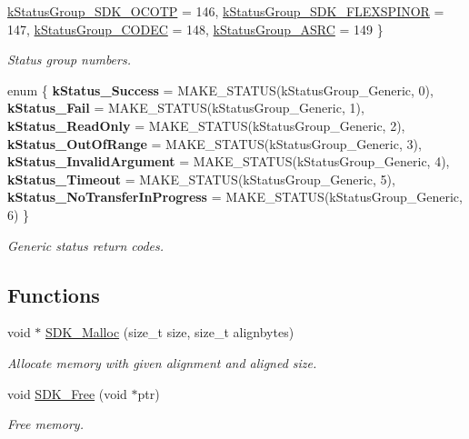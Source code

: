 \begin{DoxyCompactItemize}
\mbox{\hyperlink{group__ksdk__common_gga7ff0b98bb1341c07acefb1473b6eda29a539b147c0d1409a0e11c3ae340886fa8}{k\+Status\+Group\+\_\+\+S\+D\+K\+\_\+\+O\+C\+O\+TP}} = 146, 
\mbox{\hyperlink{group__ksdk__common_gga7ff0b98bb1341c07acefb1473b6eda29a830e5b42a05424dc026bd36d30f143a5}{k\+Status\+Group\+\_\+\+S\+D\+K\+\_\+\+F\+L\+E\+X\+S\+P\+I\+N\+OR}} = 147, 
\mbox{\hyperlink{group__ksdk__common_gga7ff0b98bb1341c07acefb1473b6eda29a7c488d28bc9be2e29bd0d133bce7389a}{k\+Status\+Group\+\_\+\+C\+O\+D\+EC}} = 148, 
\mbox{\hyperlink{group__ksdk__common_gga7ff0b98bb1341c07acefb1473b6eda29a713723bd8764655328f1e5283a8e6020}{k\+Status\+Group\+\_\+\+A\+S\+RC}} = 149
 \}
\begin{DoxyCompactList}\small\item\em Status group numbers. \end{DoxyCompactList}\item 
\mbox{\label{group__ksdk__common_gab48899087cc647f0f791ed0c459adc53}} 
enum \{ \newline
{\bfseries k\+Status\+\_\+\+Success} = M\+A\+K\+E\+\_\+\+S\+T\+A\+T\+US(k\+Status\+Group\+\_\+\+Generic, 0), 
{\bfseries k\+Status\+\_\+\+Fail} = M\+A\+K\+E\+\_\+\+S\+T\+A\+T\+US(k\+Status\+Group\+\_\+\+Generic, 1), 
{\bfseries k\+Status\+\_\+\+Read\+Only} = M\+A\+K\+E\+\_\+\+S\+T\+A\+T\+US(k\+Status\+Group\+\_\+\+Generic, 2), 
{\bfseries k\+Status\+\_\+\+Out\+Of\+Range} = M\+A\+K\+E\+\_\+\+S\+T\+A\+T\+US(k\+Status\+Group\+\_\+\+Generic, 3), 
\newline
{\bfseries k\+Status\+\_\+\+Invalid\+Argument} = M\+A\+K\+E\+\_\+\+S\+T\+A\+T\+US(k\+Status\+Group\+\_\+\+Generic, 4), 
{\bfseries k\+Status\+\_\+\+Timeout} = M\+A\+K\+E\+\_\+\+S\+T\+A\+T\+US(k\+Status\+Group\+\_\+\+Generic, 5), 
{\bfseries k\+Status\+\_\+\+No\+Transfer\+In\+Progress} = M\+A\+K\+E\+\_\+\+S\+T\+A\+T\+US(k\+Status\+Group\+\_\+\+Generic, 6)
 \}
\begin{DoxyCompactList}\small\item\em Generic status return codes. \end{DoxyCompactList}\end{DoxyCompactItemize}
\subsection*{Functions}
\begin{DoxyCompactItemize}
\item 
void $\ast$ \mbox{\hyperlink{group__ksdk__common_ga4e1420d9e817ebe0e8973420411de015}{S\+D\+K\+\_\+\+Malloc}} (size\+\_\+t size, size\+\_\+t alignbytes)
\begin{DoxyCompactList}\small\item\em Allocate memory with given alignment and aligned size. \end{DoxyCompactList}\item 
void \mbox{\hyperlink{group__ksdk__common_ga0be5caec9b8493d87cc849714bd47865}{S\+D\+K\+\_\+\+Free}} (void $\ast$ptr)
\begin{DoxyCompactList}\small\item\em Free memory. \end{DoxyCompactList}\end{DoxyCompactItemize}
